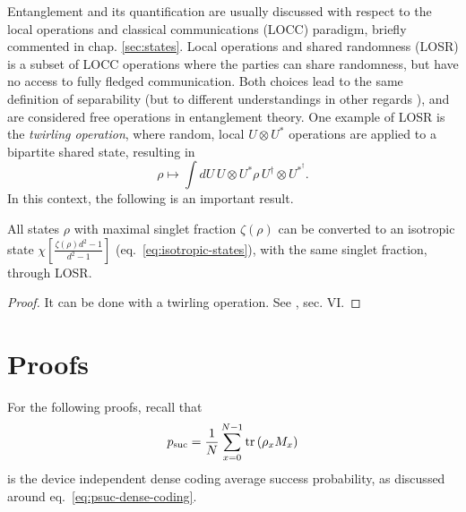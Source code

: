     Entanglement and its quantification are usually discussed with respect to the local operations and classical communications (LOCC) paradigm, briefly commented in chap. \ref{sec:states}. Local operations and shared randomness (LOSR) is a subset of LOCC operations where the parties can share randomness, but have no access to fully fledged communication. Both choices lead to the same definition of separability (but to different understandings in other regards \cite{schmid2021understanding}), and are considered free operations in entanglement theory. One example of LOSR is the \emph{twirling operation}, where random, local $U \otimes U^*$ operations are applied to a bipartite shared state, resulting in
    $$
        \rho \longmapsto \int dU\, U \otimes U^* \rho\, U^\dagger \otimes U^{*^\dagger} .
    $$
    In this context, the following is an important result. 

    \begin{lemma}
        All states $\rho$ with maximal singlet fraction $\zeta(\rho)$ can be converted to an isotropic state $\chi\left[ \frac{\zeta(\rho) d^2 - 1}{d^2 - 1} \right]$ (eq.~\eqref{eq:isotropic-states}), with the same singlet fraction, through LOSR.
        \label{lem:twirling}
    \end{lemma}
    \begin{proof}
        It can be done with a twirling operation. See \cite{horodecki_1999_isotropic}, sec. VI.
    \end{proof}


\section{Proofs}

    For the following proofs, recall that
    \begin{equation*}
        p_{\text{suc}} = \frac{1}{N} \sum_{x=0}^{N-1} \text{tr}\left( \rho_x M_x \right)
    \end{equation*}
    is the device independent dense coding average success probability, as discussed around eq.~\eqref{eq:psuc-dense-coding}. 


